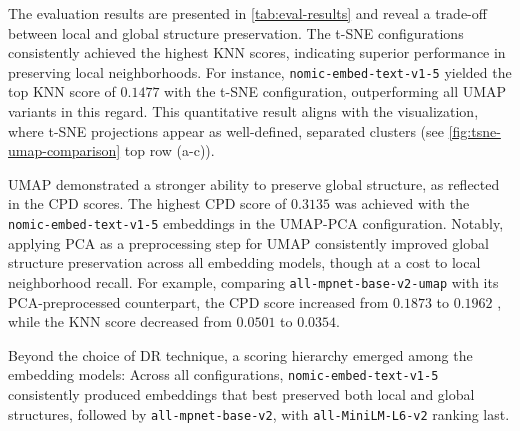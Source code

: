 \begin{table}[h!]
    \centering
    \caption{Evaluation results showing k-nearest neighbor recall (KNN) and correlation of pairwise distances (CPD) scores as described by Kury et al. \cite{kuryDREAMSPreservingBoth2025} for all pipeline configurations.}
    \label{tab:eval-results}
\end{table}

The evaluation results are presented in \autoref{tab:eval-results} and reveal a trade-off between local and global structure preservation. The t-SNE configurations consistently achieved the highest KNN scores, indicating superior performance in preserving local neighborhoods. For instance, \texttt{nomic-embed-text-v1-5} yielded the top KNN score of $0.1477$ with the t-SNE configuration, outperforming all UMAP variants in this regard. This quantitative result aligns with the visualization, where t-SNE projections appear as well-defined, separated clusters (see \autoref{fig:tsne-umap-comparison} top row (a-c)).

UMAP demonstrated a stronger ability to preserve global structure, as reflected in the CPD scores. The highest CPD score of $0.3135$ was achieved with the \texttt{nomic-embed-text-v1-5} embeddings in the UMAP-PCA configuration. Notably, applying PCA as a preprocessing step for UMAP consistently improved global structure preservation across all embedding models, though at a cost to local neighborhood recall. For example, comparing \texttt{all-mpnet-base-v2-umap} with its PCA-preprocessed counterpart, the CPD score increased from $0.1873$ to $0.1962$ , while the KNN score decreased from $0.0501$ to $0.0354$.

Beyond the choice of DR technique, a scoring hierarchy emerged among the embedding models: Across all configurations, \texttt{nomic-embed-text-v1-5} consistently produced embeddings that best preserved both local and global structures, followed by \texttt{all-mpnet-base-v2}, with \texttt{all-MiniLM-L6-v2} ranking last.

